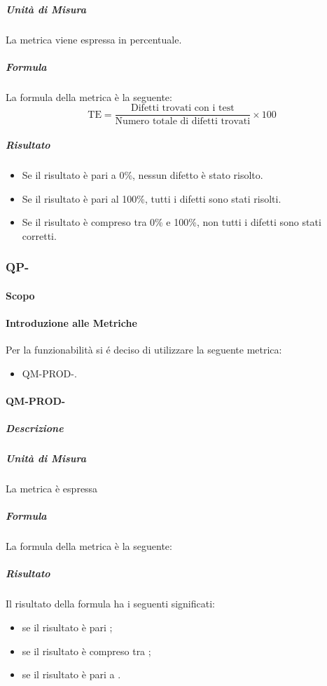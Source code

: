 			\subparagraph{Unità di Misura}
			La metrica viene espressa in percentuale.

			\subparagraph{Formula}
			La formula della metrica è la seguente:
			\[
				\text{TE} = \frac{\text{Difetti trovati con i test}}{\text{Numero totale di difetti trovati}} \times 100
			\]

			\subparagraph{Risultato}
			\begin{itemize}
				\item Se il risultato è pari a 0\%, nessun difetto è stato risolto.
				\item Se il risultato è pari al 100\%, tutti i difetti sono stati risolti.
				\item Se il risultato è compreso tra 0\% e 100\%, non tutti i difetti sono stati corretti.
			\end{itemize}



			\subsubsection{QP-}
				\paragraph{Scopo}
				\paragraph{Introduzione alle Metriche}
					Per la funzionabilità si é deciso di utilizzare la seguente metrica:
					\begin{itemize}
						\item QM-PROD-.
					\end{itemize}
				\paragraph{QM-PROD-}
					\subparagraph{Descrizione}

					\subparagraph{Unità di Misura}
						La metrica è espressa
					\subparagraph{Formula}
						La formula della metrica è la seguente:
					\subparagraph{Risultato}
						Il risultato della formula ha i seguenti significati:
						\begin{itemize}
							\item se il risultato è pari ;
							\item se il risultato è compreso tra ;
							\item se il risultato è pari a .
						\end{itemize}



